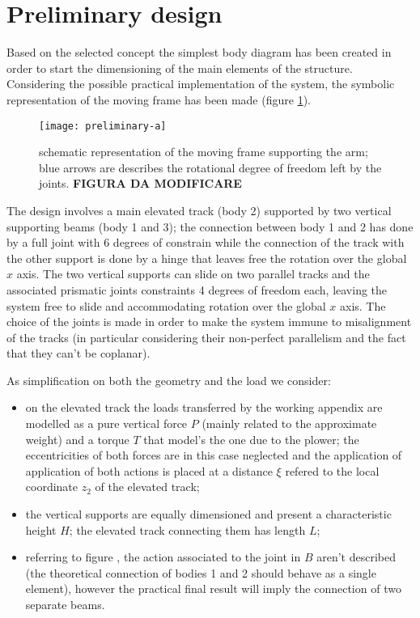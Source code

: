 \section{Preliminary design}
	Based on the selected concept the simplest body diagram has been created in order to start the dimensioning of the main elements of the structure. Considering the possible practical implementation of the system, the symbolic representation of the moving frame has been made (figure \ref{fig:freebodydiagramframe}).
	
	\begin{figure}[bht]
		\centering \texttt{[image: preliminary-a]}
		\caption{schematic representation of the moving frame supporting the arm; blue arrows are describes the rotational degree of freedom left by the joints. \textbf{FIGURA DA MODIFICARE}}
		\label{fig:freebodydiagramframe}
	\end{figure}
	
	The design involves a main elevated track (body 2) supported by two vertical supporting beams (body 1 and 3); the connection between body 1 and 2 has done by a full joint with 6 degrees of constrain while the connection of the track with the other support is done by a hinge that leaves free the rotation over the global $x$ axis. The two vertical supports can slide on two parallel tracks and the associated prismatic joints constraints 4 degrees of freedom each, leaving the system free to slide and accommodating rotation over the global $x$ axis. The choice of the joints is made in order to make the system immune to misalignment of the tracks (in particular considering their non-perfect parallelism and the fact that they can't be coplanar).
	
	As simplification on both the geometry and the load we consider:
	\begin{itemize}
		\item on the elevated track the loads transferred by the working appendix are modelled as a pure vertical force $P$ (mainly related to the approximate weight) and a torque $T$ that model's the one due to the plower; the eccentricities of both forces are in this case neglected and the application of application of both actions is placed at a distance $\xi$ refered to the local coordinate $z_2$ of the elevated track;
		
		\item the vertical supports are equally dimensioned and present a characteristic height $H$; the elevated track connecting them has length $L$;
		
		\item referring to figure \te, the action associated to the joint in $B$ aren't described (the theoretical connection of bodies 1 and 2 should behave as a single element), however the practical final result will imply the connection of two separate beams.	
		
	\end{itemize}

